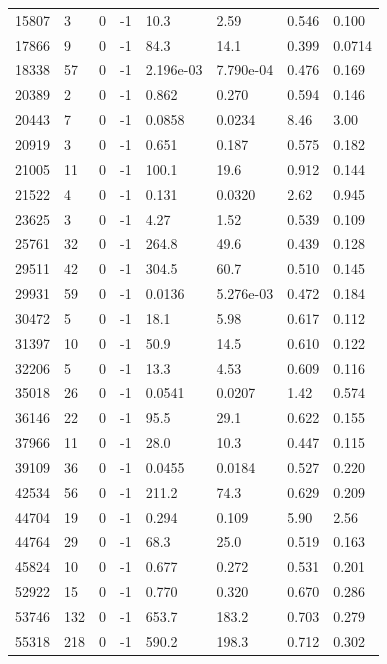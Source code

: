\documentclass[preview]{standalone}
\begin{document}
{{\begin{tabular}{L{1.2cm}C{1.2cm} C{0.3cm}C{0.5cm} C{1.4cm}C{1.4cm} C{1.4cm}C{1.4cm}}
  15807  &     3  & 0     & -1 &  10.3  & 2.59  & 0.546 &  0.100   \\ 
  17866  &     9  & 0     & -1 &  84.3  & 14.1  & 0.399 &  0.0714   \\ 
  18338  &    57  & 0     & -1 &  2.196e-03  & 7.790e-04  & 0.476 &  0.169   \\ 
  20389  &     2  & 0     & -1 &  0.862  & 0.270  & 0.594 &  0.146   \\ 
  20443  &     7  & 0     & -1 &  0.0858  & 0.0234  & 8.46 &  3.00   \\ 
  20919  &     3  & 0     & -1 &  0.651  & 0.187  & 0.575 &  0.182   \\ 
  21005  &    11  & 0     & -1 &  100.1  & 19.6  & 0.912 &  0.144   \\ 
  21522  &     4  & 0     & -1 &  0.131  & 0.0320  & 2.62 &  0.945   \\ 
  23625  &     3  & 0     & -1 &  4.27  & 1.52  & 0.539 &  0.109   \\ 
  25761  &    32  & 0     & -1 &  264.8  & 49.6  & 0.439 &  0.128   \\ 
  29511  &    42  & 0     & -1 &  304.5  & 60.7  & 0.510 &  0.145   \\ 
  29931  &    59  & 0     & -1 &  0.0136  & 5.276e-03  & 0.472 &  0.184   \\ 
  30472  &     5  & 0     & -1 &  18.1  & 5.98  & 0.617 &  0.112   \\ 
  31397  &    10  & 0     & -1 &  50.9  & 14.5  & 0.610 &  0.122   \\ 
  32206  &     5  & 0     & -1 &  13.3  & 4.53  & 0.609 &  0.116   \\ 
  35018  &    26  & 0     & -1 &  0.0541  & 0.0207  & 1.42 &  0.574   \\ 
  36146  &    22  & 0     & -1 &  95.5  & 29.1  & 0.622 &  0.155   \\ 
  37966  &    11  & 0     & -1 &  28.0  & 10.3  & 0.447 &  0.115   \\ 
  39109  &    36  & 0     & -1 &  0.0455  & 0.0184  & 0.527 &  0.220   \\ 
  42534  &    56  & 0     & -1 &  211.2  & 74.3  & 0.629 &  0.209   \\ 
  44704  &    19  & 0     & -1 &  0.294  & 0.109  & 5.90 &  2.56   \\ 
  44764  &    29  & 0     & -1 &  68.3  & 25.0  & 0.519 &  0.163   \\ 
  45824  &    10  & 0     & -1 &  0.677  & 0.272  & 0.531 &  0.201   \\ 
  52922  &    15  & 0     & -1 &  0.770  & 0.320  & 0.670 &  0.286   \\ 
  53746  &   132  & 0     & -1 &  653.7  & 183.2  & 0.703 &  0.279   \\ 
  55318  &   218  & 0     & -1 &  590.2  & 198.3  & 0.712 &  0.302   \\ 
\hline 
\end{tabular} 

}}
\end{document}
